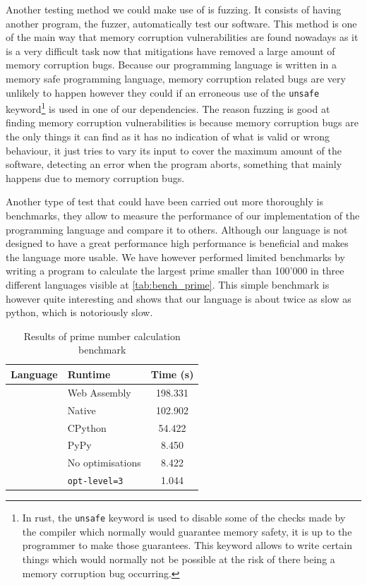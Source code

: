 \documentclass{article}
\begin{document}
Another testing method we could make use of is fuzzing. It consists of having
another program, the fuzzer, automatically test our software. This method is
one of the main way that memory corruption vulnerabilities are found nowadays
as it is a very difficult task now that mitigations have removed a large amount
of memory corruption bugs. Because our programming language is written in a
memory safe programming language, memory corruption related bugs are very
unlikely to happen however they could if an erroneous use of the
\texttt{unsafe} keyword\footnote{In rust, the \texttt{unsafe} keyword is used
to disable some of the checks made by the compiler which normally would
guarantee memory safety, it is up to the programmer to make those guarantees.
This keyword allows to write certain things which would normally not be
possible at the risk of there being a memory corruption bug occurring.} is used
in one of our dependencies. The reason fuzzing is good at finding memory
corruption vulnerabilities is because memory corruption bugs are the only
things it can find as it has no indication of what is valid or wrong behaviour,
it just tries to vary its input to cover the maximum amount of the software,
detecting an error when the program aborts, something that mainly happens due
to memory corruption bugs.

Another type of test that could have been carried out more thoroughly is
benchmarks, they allow to measure the performance of our implementation of the
programming language and compare it to others. Although our language is not
designed to have a great performance high performance is beneficial and makes
the language more usable. We have however performed limited benchmarks by
writing a program to calculate the largest prime smaller than 100'000 in three
different languages visible at \autoref{tab:bench_prime}. This simple benchmark
is however quite interesting and shows that our language is about twice as slow
as python, which is notoriously slow.

\begin{table}
	\begin{center}
		\begin{tabular}{|l|l|S|}
			\hline
			Language & Runtime & Time (s) \\
			\hline
			 & Web Assembly & 198.331 \\
			& Native & 102.902 \\
			\hline
			 & CPython & 54.422 \\
			& PyPy & 8.450 \\
			\hline
			 & No optimisations & 8.422 \\
			& \texttt{opt-level=3} & 1.044 \\
			\hline
		\end{tabular}
	\end{center}
	\caption{Results of prime number calculation benchmark}
	\label{tab:bench_prime}
\end{table}
\end{document}
